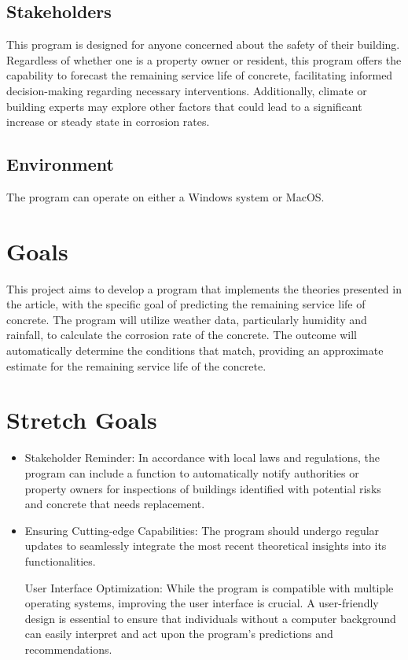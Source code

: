 \documentclass{article}
\begin{document}
\subsection{Stakeholders}
\begin{itemize}
This program is designed for anyone concerned about the safety of their building. Regardless of whether one is a property owner or resident, this program offers the capability to forecast the remaining service life of concrete, facilitating informed decision-making regarding necessary interventions. Additionally, climate or building experts may explore other factors that could lead to a significant increase or steady state in corrosion rates.
\end{itemize}
\subsection{Environment}
The program can operate on either a Windows system or MacOS.

\section{Goals}
This project aims to develop a program that implements the theories presented in the article, with the specific goal of predicting the remaining service life of concrete. The program will utilize weather data, particularly humidity and rainfall, to calculate the corrosion rate of the concrete. The outcome will automatically determine the conditions that match, providing an approximate estimate for the remaining service life of the concrete.

\section{Stretch Goals}
\begin{itemize}
    \item Stakeholder Reminder: In accordance with local laws and regulations, the program can include a function to automatically notify authorities or property owners for inspections of buildings identified with potential risks and concrete that needs replacement.

    \item Ensuring Cutting-edge Capabilities: The program should undergo regular updates to seamlessly integrate the most recent theoretical insights into its functionalities.

    \itme User Interface Optimization: While the program is compatible with multiple operating systems, improving the user interface is crucial. A user-friendly design is essential to ensure that individuals without a computer background can easily interpret and act upon the program's predictions and recommendations.
    
\end{itemize}
\end{document}
